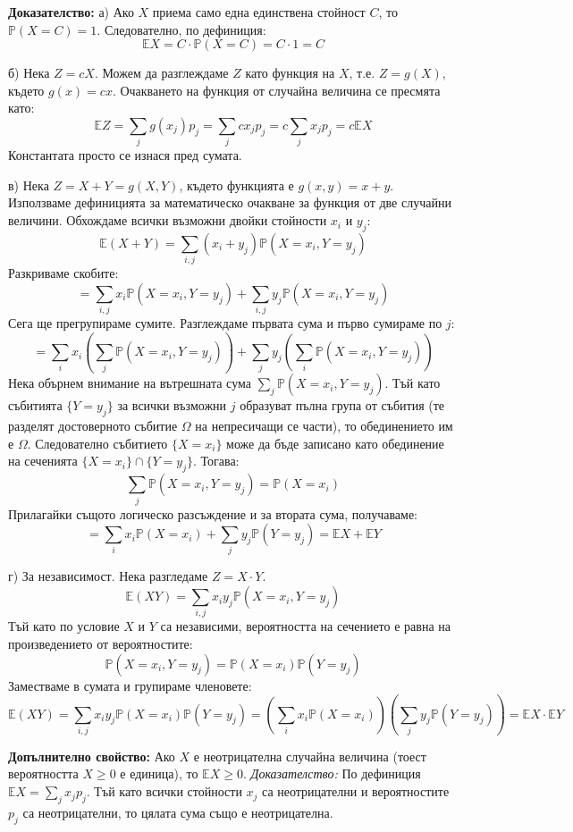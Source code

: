 \documentclass{article}
\begin{document}
\textbf{Доказателство:}
а) Ако $X$ приема само една единствена стойност $C$, то $\mathbb{P}(X=C) = 1$. Следователно, по дефиниция:
\[ \mathbb{E}X = C \cdot \mathbb{P}(X=C) = C \cdot 1 = C \]

б) Нека $Z = cX$. Можем да разглеждаме $Z$ като функция на $X$, т.е. $Z = g(X)$, където $g(x) = cx$. Очакването на функция от случайна величина се пресмята като:
\[ \mathbb{E}Z = \sum_{j} g(x_j) p_j = \sum_{j} c x_j p_j = c \sum_{j} x_j p_j = c\mathbb{E}X \]
Константата просто се изнася пред сумата.

в) Нека $Z = X + Y = g(X,Y)$, където функцията е $g(x,y) = x+y$. Използваме дефиницията за математическо очакване за функция от две случайни величини. Обхождаме всички възможни двойки стойности $x_i$ и $y_j$:
\[ \mathbb{E}(X+Y) = \sum_{i, j} (x_i + y_j) \mathbb{P}(X=x_i, Y=y_j) \]
Разкриваме скобите:
\[ = \sum_{i, j} x_i \mathbb{P}(X=x_i, Y=y_j) + \sum_{i, j} y_j \mathbb{P}(X=x_i, Y=y_j) \]
Сега ще прегрупираме сумите. Разглеждаме първата сума и първо сумираме по $j$:
\[ = \sum_{i} x_i \left( \sum_{j} \mathbb{P}(X=x_i, Y=y_j) \right) + \sum_{j} y_j \left( \sum_{i} \mathbb{P}(X=x_i, Y=y_j) \right) \]
Нека обърнем внимание на вътрешната сума $\sum_{j} \mathbb{P}(X=x_i, Y=y_j)$. Тъй като събитията $\{Y=y_j\}$ за всички възможни $j$ образуват пълна група от събития (те разделят достоверното събитие $\Omega$ на непресичащи се части), то обединението им е $\Omega$. Следователно събитието $\{X=x_i\}$ може да бъде записано като обединение на сеченията $\{X=x_i\} \cap \{Y=y_j\}$. Тогава:
\[ \sum_{j} \mathbb{P}(X=x_i, Y=y_j) = \mathbb{P}(X=x_i) \]
Прилагайки същото логическо разсъждение и за втората сума, получаваме:
\[ = \sum_{i} x_i \mathbb{P}(X=x_i) + \sum_{j} y_j \mathbb{P}(Y=y_j) = \mathbb{E}X + \mathbb{E}Y \]

г) За независимост. Нека разгледаме $Z = X \cdot Y$.
\[ \mathbb{E}(XY) = \sum_{i, j} x_i y_j \mathbb{P}(X=x_i, Y=y_j) \]
Тъй като по условие $X$ и $Y$ са независими, вероятността на сечението е равна на произведението от вероятностите:
\[ \mathbb{P}(X=x_i, Y=y_j) = \mathbb{P}(X=x_i) \mathbb{P}(Y=y_j) \]
Заместваме в сумата и групираме членовете:
\[ \mathbb{E}(XY) = \sum_{i, j} x_i y_j \mathbb{P}(X=x_i)\mathbb{P}(Y=y_j) = \left( \sum_{i} x_i \mathbb{P}(X=x_i) \right) \left( \sum_{j} y_j \mathbb{P}(Y=y_j) \right) = \mathbb{E}X \cdot \mathbb{E}Y \]

\textbf{Допълнително свойство:}
Ако $X$ е неотрицателна случайна величина (тоест вероятността $X \ge 0$ е единица), то $\mathbb{E}X \ge 0$.
\textit{Доказателство:} По дефиниция $\mathbb{E}X = \sum_{j} x_j p_j$. Тъй като всички стойности $x_j$ са неотрицателни и вероятностите $p_j$ са неотрицателни, то цялата сума също е неотрицателна.
\end{document}
